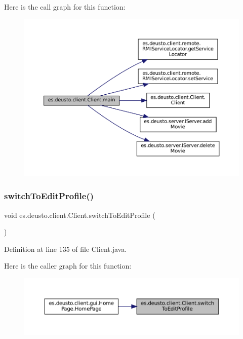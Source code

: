 Here is the call graph for this function\+:
\nopagebreak
\begin{figure}[H]
\begin{center}
\leavevmode
\includegraphics[width=350pt]{classes_1_1deusto_1_1client_1_1_client_a69a7526d0af9cb2341f4bf341b501152_cgraph}
\end{center}
\end{figure}
\mbox{\label{classes_1_1deusto_1_1client_1_1_client_afefdad03c88bee0a0427af249604cf19}} 
\subsubsection{\texorpdfstring{switchToEditProfile()}{switchToEditProfile()}}
{\footnotesize\ttfamily void es.\+deusto.\+client.\+Client.\+switch\+To\+Edit\+Profile (\begin{DoxyParamCaption}{ }\end{DoxyParamCaption})}



Definition at line 135 of file Client.\+java.

Here is the caller graph for this function\+:
\nopagebreak
\begin{figure}[H]
\begin{center}
\leavevmode
\includegraphics[width=350pt]{classes_1_1deusto_1_1client_1_1_client_afefdad03c88bee0a0427af249604cf19_icgraph}
\end{center}
\end{figure}
\mbox{\label{classes_1_1deusto_1_1client_1_1_client_aff17deef622ce410b473d4dadad36343}} 
